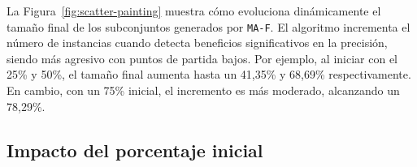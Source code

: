 La Figura~\ref{fig:scatter-painting} muestra cómo evoluciona dinámicamente el tamaño final de los subconjuntos generados por \texttt{MA-F}.
El algoritmo incrementa el número de instancias cuando detecta beneficios significativos en la precisión, siendo más agresivo con puntos de partida bajos.
Por ejemplo, al iniciar con el 25\% y 50\%, el tamaño final aumenta hasta un 41,35\% y 68,69\% respectivamente.
En cambio, con un 75\% inicial, el incremento es más moderado, alcanzando un 78,29\%.

\subsection{Impacto del porcentaje inicial}

\begin{table}[htp]
    \centering
\end{table}
